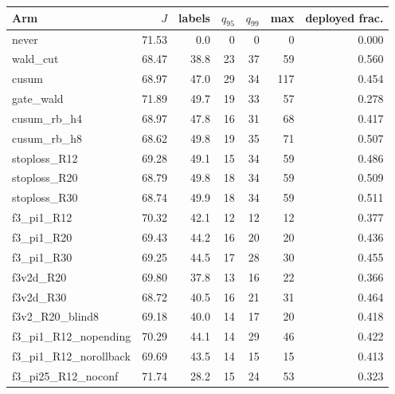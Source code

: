 \begin{tabular}{@{}l r r r r r r@{}}
\toprule
Arm & $J$ & labels & $q_{95}$ & $q_{99}$ & max & deployed frac. \\
\midrule
never & 71.53 & 0.0 & 0 & 0 & 0 & 0.000 \\
wald\_cut & 68.47 & 38.8 & 23 & 37 & 59 & 0.560 \\
cusum & 68.97 & 47.0 & 29 & 34 & 117 & 0.454 \\
gate\_wald & 71.89 & 49.7 & 19 & 33 & 57 & 0.278 \\
cusum\_rb\_h4 & 68.97 & 47.8 & 16 & 31 & 68 & 0.417 \\
cusum\_rb\_h8 & 68.62 & 49.8 & 19 & 35 & 71 & 0.507 \\
stoploss\_R12 & 69.28 & 49.1 & 15 & 34 & 59 & 0.486 \\
stoploss\_R20 & 68.79 & 49.8 & 18 & 34 & 59 & 0.509 \\
stoploss\_R30 & 68.74 & 49.9 & 18 & 34 & 59 & 0.511 \\
f3\_pi1\_R12 & 70.32 & 42.1 & 12 & 12 & 12 & 0.377 \\
f3\_pi1\_R20 & 69.43 & 44.2 & 16 & 20 & 20 & 0.436 \\
f3\_pi1\_R30 & 69.25 & 44.5 & 17 & 28 & 30 & 0.455 \\
f3v2d\_R20 & 69.80 & 37.8 & 13 & 16 & 22 & 0.366 \\
f3v2d\_R30 & 68.72 & 40.5 & 16 & 21 & 31 & 0.464 \\
f3v2\_R20\_blind8 & 69.18 & 40.0 & 14 & 17 & 20 & 0.418 \\
f3\_pi1\_R12\_nopending & 70.29 & 44.1 & 14 & 29 & 46 & 0.422 \\
f3\_pi1\_R12\_norollback & 69.69 & 43.5 & 14 & 15 & 15 & 0.413 \\
f3\_pi25\_R12\_noconf & 71.74 & 28.2 & 15 & 24 & 53 & 0.323 \\
\bottomrule
\end{tabular}
